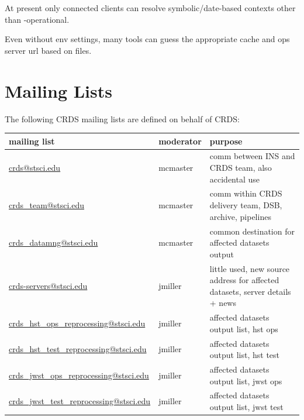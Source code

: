 \documentclass[letterpaper,10pt,english]{sphinxmanual}
\begin{document}
At present only connected clients can resolve symbolic/date-based contexts other than -operational.

Even without env settings,  many tools can guess the appropriate cache and ops server url based on files.


\chapter{Mailing Lists}
\label{server_guide:mailing-lists}
The following CRDS mailing lists are defined on behalf of CRDS:

\begin{tabulary}{\linewidth}{|L|L|L|}
\hline
\textbf{
mailing list
} & \textbf{
moderator
} & \textbf{
purpose
}\\\hline

\href{mailto:crds@stsci.edu}{crds@stsci.edu}
 & 
mcmaster
 & 
comm between INS and CRDS team, also accidental use
\\\hline

\href{mailto:crds\_team@stsci.edu}{crds\_team@stsci.edu}
 & 
mcmaster
 & 
comm within CRDS delivery team, DSB, archive, pipelines
\\\hline

\href{mailto:crds\_datamng@stsci.edu}{crds\_datamng@stsci.edu}
 & 
mcmaster
 & 
common destination for affected datasets output
\\\hline

\href{mailto:crds-servers@stsci.edu}{crds-servers@stsci.edu}
 & 
jmiller
 & 
little used,  new source address for affected datasets,  server details + news
\\\hline

\href{mailto:crds\_hst\_ops\_reprocessing@stsci.edu}{crds\_hst\_ops\_reprocessing@stsci.edu}
 & 
jmiller
 & 
affected datasets output list, hst ops
\\\hline

\href{mailto:crds\_hst\_test\_reprocessing@stsci.edu}{crds\_hst\_test\_reprocessing@stsci.edu}
 & 
jmiller
 & 
affected datasets output list, hst test
\\\hline

\href{mailto:crds\_jwst\_ops\_reprocessing@stsci.edu}{crds\_jwst\_ops\_reprocessing@stsci.edu}
 & 
jmiller
 & 
affected datasets output list, jwst ops
\\\hline

\href{mailto:crds\_jwst\_test\_reprocessing@stsci.edu}{crds\_jwst\_test\_reprocessing@stsci.edu}
 & 
jmiller
 & 
affected datasets output list, jwst test
\\\hline
\end{tabulary}
\end{document}
